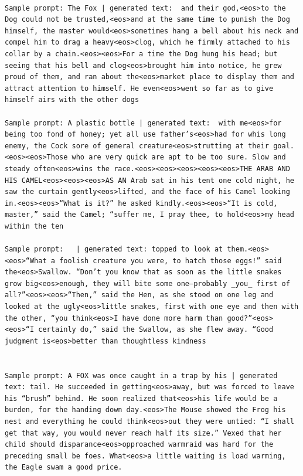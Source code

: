 \documentclass{article}
\begin{document}
\begin{lstlisting}

Sample prompt: The Fox | generated text:  and their god,<eos>to the Dog could not be trusted,<eos>and at the same time to punish the Dog himself, the master would<eos>sometimes hang a bell about his neck and compel him to drag a heavy<eos>clog, which he firmly attached to his collar by a chain.<eos><eos>For a time the Dog hung his head; but seeing that his bell and clog<eos>brought him into notice, he grew proud of them, and ran about the<eos>market place to display them and attract attention to himself. He even<eos>went so far as to give himself airs with the other dogs

Sample prompt: A plastic bottle | generated text:  with me<eos>for being too fond of honey; yet all use father’s<eos>had for whis long enemy, the Cock sore of general creature<eos>strutting at their goal.<eos><eos>Those who are very quick are apt to be too sure. Slow and steady often<eos>wins the race.<eos><eos><eos><eos><eos>THE ARAB AND HIS CAMEL<eos><eos><eos>AS AN Arab sat in his tent one cold night, he saw the curtain gently<eos>lifted, and the face of his Camel looking in.<eos><eos>“What is it?” he asked kindly.<eos><eos>“It is cold, master,” said the Camel; “suffer me, I pray thee, to hold<eos>my head within the ten

Sample prompt:   | generated text: topped to look at them.<eos><eos>“What a foolish creature you were, to hatch those eggs!” said the<eos>Swallow. “Don’t you know that as soon as the little snakes grow big<eos>enough, they will bite some one—probably _you_ first of all?”<eos><eos>“Then,” said the Hen, as she stood on one leg and looked at the ugly<eos>little snakes, first with one eye and then with the other, “you think<eos>I have done more harm than good?”<eos><eos>“I certainly do,” said the Swallow, as she flew away. “Good judgment is<eos>better than thoughtless kindness


Sample prompt: A FOX was once caught in a trap by his | generated text: tail. He succeeded in getting<eos>away, but was forced to leave his “brush” behind. He soon realized that<eos>his life would be a burden, for the handing down day.<eos>The Mouse showed the Frog his nest and everything he could think<eos>out they were untied: “I shall get that way, you would never reach half its size.” Vexed that her child should disparance<eos>opproached warmraid was hard for the preceding small be foes. What<eos>a little waiting is load warming, the Eagle swam a good price.


\end{lstlisting}
\end{document}
